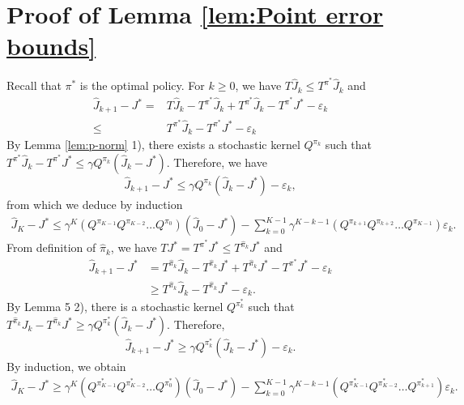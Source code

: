 \documentclass[12pt,technote,onecolumn]{IEEEtran}
\begin{document}
\section*{Proof of Lemma \ref{lem:Point error bounds}}
\begin{IEEEproof}
	Recall that $\pi^{*}$ is the optimal policy. For $k\geq0$, we have
	$T\widehat{J}_{k}\leq T^{\pi^{*}}\widehat{J}_{k}$ and 
	\begin{equation*}		
	\begin{aligned}
	\widehat{J}_{k+1}-J^{*}=&T\widehat{J}_{k}-T^{\pi^{*}}\widehat{J}_{k}+T^{\pi^{*}}\widehat{J}_{k}-T^{\pi^{*}}J^{*}-\varepsilon_{k}\\\leq& T^{\pi^{*}}\widehat{J}_{k}-T^{\pi^{*}}J^{*}-\varepsilon_{k}
	\end{aligned}
	\end{equation*}
	By Lemma \ref{lem:p-norm} 1), there exists a stochastic kernel $Q^{\pi_{k}}$
	such that $T^{\pi^{*}}\widehat{J}_{k}-T^{\pi^{*}}J^{*}\leq\gamma Q^{\pi_{k}}(\widehat{J}_{k}-J^{*})$.
	Therefore, we have		
	\[
	\widehat{J}_{k+1}-J^{*}\leq\gamma Q^{\pi_{k}}(\widehat{J}_{k}-J^{*})-\varepsilon_{k},
	\]
	from which we deduce by induction		
	\begin{equation}\label{lem8-1}		
	\begin{aligned}
	\widehat{J}_{K}-J^{*}\leq\gamma^{K}(Q^{\pi_{K-1}}Q^{\pi_{K-2}}\dots Q^{\pi_{0}})(\widehat{J}_{0}-J^{*})
	-\sum_{k=0}^{K-1}\gamma^{K-k-1}\left(Q^{\pi_{k+1}}Q^{\pi_{k+2}}\dots Q^{\pi_{K-1}}\right)\varepsilon_{k}.
	\end{aligned}
	\end{equation}		
	From definition of $\widehat{\pi}_{k}$, we have $TJ^{*}=T^{\pi^{*}}J^{*}\leq T^{\widehat{\pi}_{k}}J^{*}$
	and
	\begin{equation*}		
	\begin{aligned}
	\widehat{J}_{k+1}-J^{*}&=T^{\widehat{\pi}_{k}}\widehat{J}_{k}-T^{\widehat{\pi}_{k}}J^{*}+T^{\widehat{\pi}_{k}}J^{*}-T^{\pi^{*}}J^{*}-\varepsilon_{k}\\
	&\geq T^{\widehat{\pi}_{k}}\widehat{J}_{k}-T^{\widehat{\pi}_{k}}J^{*}-\varepsilon_{k}.
	\end{aligned}
	\end{equation*}	
	By Lemma 5 2), there is a stochastic kernel $Q^{\pi_{k}^{*}}$
	such that $T^{\widehat{\pi}_{k}}J_{k}-T^{\widehat{\pi}_{k}}J^{*}\geq\gamma Q^{\pi_{k}^{*}}(\widehat{J}_{k}-J^{*})$.
	Therefore,		
	\[
	\widehat{J}_{k+1}-J^{*}\geq\gamma Q^{\pi_{k}^{*}}(\widehat{J}_{k}-J^{*})-\varepsilon_{k}.
	\]
	By induction, we obtain
	\begin{equation}\label{lem8-2}		
	\begin{aligned}
	\widehat{J}_{K}-J^{*}\geq\gamma^{K}(Q^{\pi_{K-1}^{*}}Q^{\pi_{K-2}^{*}}\dots Q^{\pi_{0}^{*}})(\widehat{J}_{0}-J^{*})
	-\sum_{k=0}^{K-1}\gamma^{K-k-1}(Q^{\pi_{K-1}^{*}}Q^{\pi_{K-2}^{*}}\dots Q^{\pi_{k+1}^{*}})\varepsilon_{k}.
	\end{aligned}
	\end{equation}	
	

\end{IEEEproof}
\end{document}
